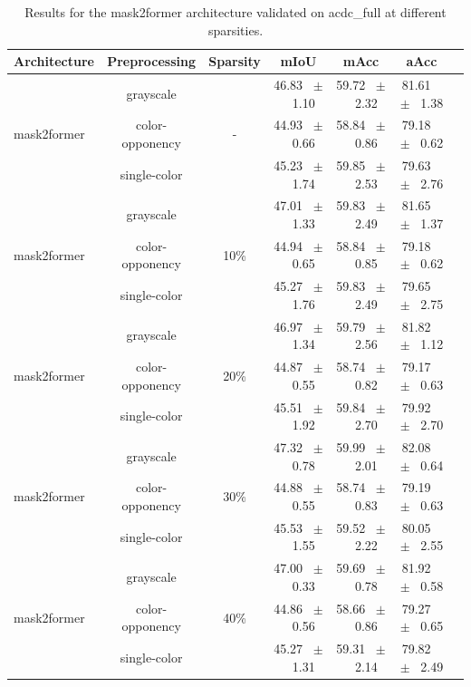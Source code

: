 \begin{table}[h]
  \centering
  \caption{Results for the mask2former architecture validated on acdc_full at different sparsities.}
  \begin{tabular}{@{}lccc ccc@{}}
    \toprule
    Architecture & Preprocessing & Sparsity & mIoU & mAcc & aAcc \\
    \midrule

    \multirow{3}{*}{mask2former} & grayscale & \multirow{3}{*}{-} & 46.83 ~$\pm$~ 1.10 & 59.72 ~$\pm$~ 2.32 & 81.61 ~$\pm$~ 1.38 \\
    & color-opponency &  & 44.93 ~$\pm$~ 0.66 & 58.84 ~$\pm$~ 0.86 & 79.18 ~$\pm$~ 0.62 \\
    & single-color &  & 45.23 ~$\pm$~ 1.74 & 59.85 ~$\pm$~ 2.53 & 79.63 ~$\pm$~ 2.76 \\
    \midrule
    \multirow{3}{*}{mask2former} & grayscale & \multirow{3}{*}{10\%} & 47.01 ~$\pm$~ 1.33 & 59.83 ~$\pm$~ 2.49 & 81.65 ~$\pm$~ 1.37 \\
    & color-opponency &  & 44.94 ~$\pm$~ 0.65 & 58.84 ~$\pm$~ 0.85 & 79.18 ~$\pm$~ 0.62 \\
    & single-color &  & 45.27 ~$\pm$~ 1.76 & 59.83 ~$\pm$~ 2.49 & 79.65 ~$\pm$~ 2.75 \\
    \midrule
    \multirow{3}{*}{mask2former} & grayscale & \multirow{3}{*}{20\%} & 46.97 ~$\pm$~ 1.34 & 59.79 ~$\pm$~ 2.56 & 81.82 ~$\pm$~ 1.12 \\
    & color-opponency &  & 44.87 ~$\pm$~ 0.55 & 58.74 ~$\pm$~ 0.82 & 79.17 ~$\pm$~ 0.63 \\
    & single-color &  & 45.51 ~$\pm$~ 1.92 & 59.84 ~$\pm$~ 2.70 & 79.92 ~$\pm$~ 2.70 \\
    \midrule
    \multirow{3}{*}{mask2former} & grayscale & \multirow{3}{*}{30\%} & 47.32 ~$\pm$~ 0.78 & 59.99 ~$\pm$~ 2.01 & 82.08 ~$\pm$~ 0.64 \\
    & color-opponency &  & 44.88 ~$\pm$~ 0.55 & 58.74 ~$\pm$~ 0.83 & 79.19 ~$\pm$~ 0.63 \\
    & single-color &  & 45.53 ~$\pm$~ 1.55 & 59.52 ~$\pm$~ 2.22 & 80.05 ~$\pm$~ 2.55 \\
    \midrule
    \multirow{3}{*}{mask2former} & grayscale & \multirow{3}{*}{40\%} & 47.00 ~$\pm$~ 0.33 & 59.69 ~$\pm$~ 0.78 & 81.92 ~$\pm$~ 0.58 \\
    & color-opponency &  & 44.86 ~$\pm$~ 0.56 & 58.66 ~$\pm$~ 0.86 & 79.27 ~$\pm$~ 0.65 \\
    & single-color &  & 45.27 ~$\pm$~ 1.31 & 59.31 ~$\pm$~ 2.14 & 79.82 ~$\pm$~ 2.49 \\

\end{tabular}
\end{table}
